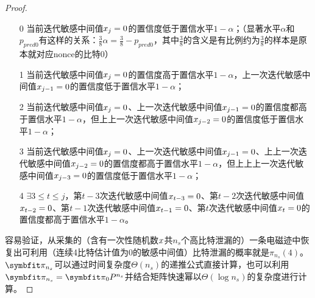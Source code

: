 {{\begin{proof}
		\begin{enumerate}
			\item [0] 当前迭代敏感中间值$x_j=0$的置信度低于置信水平$1-\alpha$；（显著水平$\alpha$和$p_{pred0}$有这样的关系：$\frac38\alpha=\frac38-p_{pred0}$，其中$\frac38$的含义是有比例约为$\frac38$的样本是原本就对应nonce的比特0）
			\item [1] 当前迭代敏感中间值$x_j=0$的置信度高于置信水平$1-\alpha$，上一次迭代敏感中间值$x_{j-1}=0$的置信度低于置信水平$1-\alpha$；
			\item [2] 当前迭代敏感中间值$x_j=0$、上一次迭代敏感中间值$x_{j-1}=0$的置信度都高于置信水平$1-\alpha$，但上上一次迭代敏感中间值$x_{j-2}=0$的置信度低于置信水平$1-\alpha$；
			\item [3] 当前迭代敏感中间值$x_j=0$、上一次迭代敏感中间值$x_{j-1}=0$、上上一次迭代敏感中间值$x_{j-2}=0$的置信度都高于置信水平$1-\alpha$，但上上上一次迭代敏感中间值$x_{j-3}=0$的置信度低于置信水平$1-\alpha$；
			\item [4] $\exists 3\le t\le j$，第$t-3$次迭代敏感中间值$x_{t-3}=0$、第$t-2$次迭代敏感中间值$x_{t-2}=0$、第$t-1$次迭代敏感中间值$x_{t-1}=0$、第$t$次迭代敏感中间值$x_{t}=0$的置信度都高于置信水平$1-\alpha$。
		\end{enumerate}
		
		容易验证，从采集的（含有一次性随机数$x$共$n_s$个高比特泄漏的）一条电磁迹中恢复出可利用（连续4比特估计值为0的敏感中间值）比特泄漏的概率就是$\pi_{n_s}(4)$。$\Vector \pi_{n_s}$可以通过时间复杂度$\Theta(n_s)$的递推公式直接计算，也可以利用$\Vector \pi_{n_s}=\Vector \pi_0 P^{n_s}$并结合矩阵快速幂以$\Theta(\log n_s)$的复杂度进行计算。
		

\end{proof}}}
